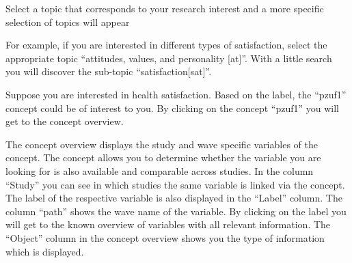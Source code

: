 \documentclass[letterpaper,10pt,openany,onesideH,english]{sphinxmanual}
\begin{document}
\begin{figure}[H]
\centering

\noindent{}
\end{figure}

Select a topic that corresponds to your research interest and a more specific selection of topics will appear

\begin{figure}[H]
\centering

\noindent{}
\end{figure}

For example, if you are interested in different types of satisfaction, select the appropriate topic “attitudes, values, and personality {[}at{]}”. With a little search you will discover the sub-topic “satisfaction{[}sat{]}”.

\begin{figure}[H]
\centering

\noindent{}
\end{figure}

Suppose you are interested in health satisfaction. Based on the label, the “pzuf1” concept could be of interest to you. By clicking on the concept “pzuf1” you will get to the concept overview.

\begin{figure}[H]
\centering

\noindent{}
\end{figure}

The concept overview displays the study and wave specific variables of the concept. The concept allows you to determine whether the variable you are looking for is also available and comparable across studies.
In the column “Study” you can see in which studies the same variable is linked via the concept. The label of the respective variable is also displayed in the “Label” column. The column “path” shows the wave name of the variable. By clicking on the label you will get to the known overview of variables with all relevant information. The “Object” column in the concept overview shows you the type of information which is displayed.

\begin{figure}[H]
\centering

\noindent{}
\end{figure}
\end{document}
